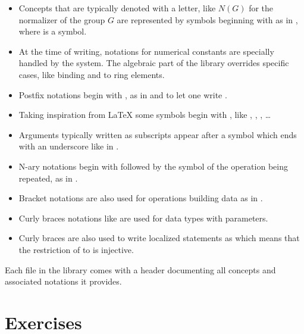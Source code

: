 \begin{itemize}
\item Concepts that are typically denoted with a letter, like $N(G)$ for the
	normalizer of the group $G$ are represented by symbols beginning
	with  as in , where  is a symbol.  
\item At the time of writing, notations for numerical constants are specially
	handled by the system.  The algebraic part of the library overrides
	specific cases, like binding  and  to ring elements.
\item Postfix notations begin with , as in  and 
	to let one write .
\item Taking inspiration from \LaTeX{} some symbols begin with \C{\\},
	like \C{\\in}, \C{\\matrix}, \C{\\sum}, \ldots
\item Arguments typically written as subscripts appear after a symbol
	which ends with an underscore like  in .
\item N-ary notations begin with \C{[} followed by the symbol of the
	operation being repeated, as in .
\item Bracket notations are also used  for operations building data as in
	\C{[seq .. | .. ]}.
\item Curly braces notations like  are used for data types
	with parameters.
\item Curly braces are also used to write localized statements
	as 
	which means that the restriction of  to  is injective.
\end{itemize}

Each file in the \mcbMC{} library comes with a header documenting 
all concepts and associated notations it provides.


\newpage
\section{Exercises}


